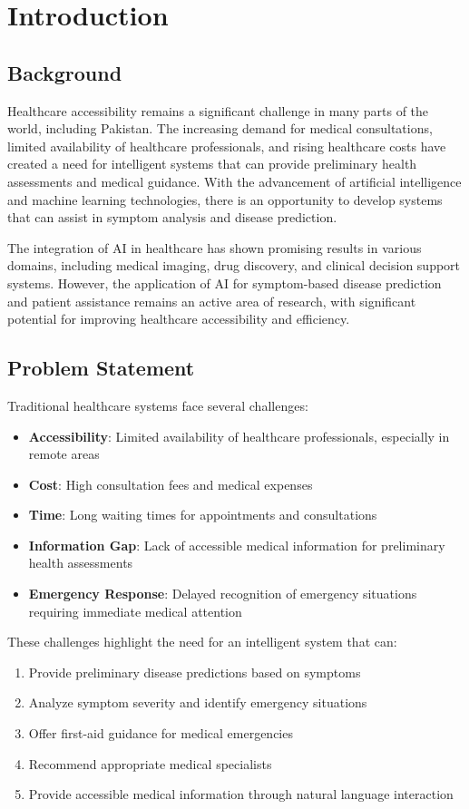 \chapter{Introduction}

\section{Background}
Healthcare accessibility remains a significant challenge in many parts of the world, including Pakistan. The increasing demand for medical consultations, limited availability of healthcare professionals, and rising healthcare costs have created a need for intelligent systems that can provide preliminary health assessments and medical guidance. With the advancement of artificial intelligence and machine learning technologies, there is an opportunity to develop systems that can assist in symptom analysis and disease prediction.

The integration of AI in healthcare has shown promising results in various domains, including medical imaging, drug discovery, and clinical decision support systems. However, the application of AI for symptom-based disease prediction and patient assistance remains an active area of research, with significant potential for improving healthcare accessibility and efficiency.

\section{Problem Statement}
Traditional healthcare systems face several challenges:

\begin{itemize}
    \item \textbf{Accessibility}: Limited availability of healthcare professionals, especially in remote areas
    \item \textbf{Cost}: High consultation fees and medical expenses
    \item \textbf{Time}: Long waiting times for appointments and consultations
    \item \textbf{Information Gap}: Lack of accessible medical information for preliminary health assessments
    \item \textbf{Emergency Response}: Delayed recognition of emergency situations requiring immediate medical attention
\end{itemize}

These challenges highlight the need for an intelligent system that can:
\begin{enumerate}
    \item Provide preliminary disease predictions based on symptoms
    \item Analyze symptom severity and identify emergency situations
    \item Offer first-aid guidance for medical emergencies
    \item Recommend appropriate medical specialists
    \item Provide accessible medical information through natural language interaction
\end{enumerate}

